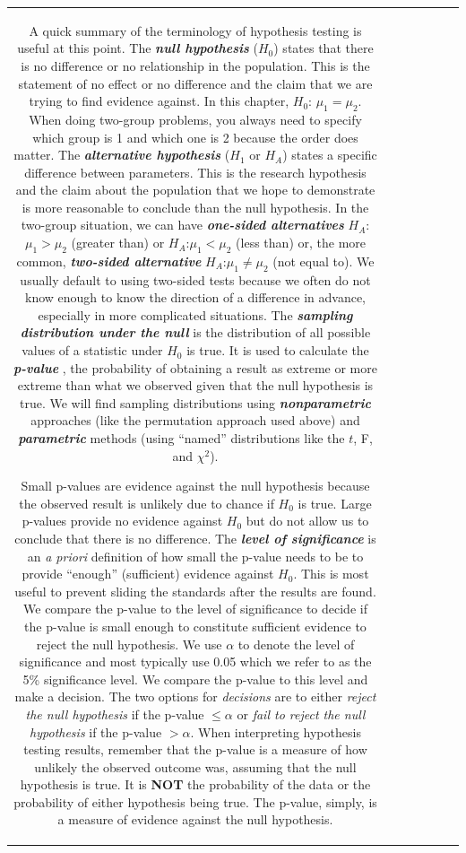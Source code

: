 \documentclass[]{book}
\theoremstyle{definition}
\theoremstyle{definition}
\theoremstyle{remark}
\begin{document}
\begin{longtable}[]{@{}ccccccc@{}}
\begin{minipage}[b]{0.10\columnwidth}
A quick summary of the terminology of hypothesis testing is useful at
this point. The \textbf{\emph{null hypothesis}} (\(H_0\)) states that
there is no difference or no relationship in the population. This is the
statement of no effect or no difference and the claim that we are trying
to find evidence against. In this chapter, \(H_0\): \(\mu_1=\mu_2\).
When doing two-group problems, you always need to specify which group is
1 and which one is 2 because the order does matter. The
\textbf{\emph{alternative hypothesis}} (\(H_1\) or \(H_A\)) states a
specific difference between parameters. This is the research hypothesis
and the claim about the population that we hope to demonstrate is more
reasonable to conclude than the null hypothesis. In the two-group
situation, we can have \textbf{\emph{one-sided alternatives}}
\(H_A\):\(\mu_1 > \mu_2\) (greater than) or \(H_A\):\(\mu_1 < \mu_2\)
(less than) or, the more common, \textbf{\emph{two-sided alternative}}
\(H_A\):\(\mu_1 \ne \mu_2\) (not equal to). We usually default to using
two-sided tests because we often do not know enough to know the
direction of a difference in advance, especially in more complicated
situations. The \textbf{\emph{sampling distribution under the null}} is
the distribution of all possible values of a statistic under \(H_0\) is
true. It is used to calculate the \textbf{\emph{p-value}} , the
probability of obtaining a result as extreme or more extreme than what
we observed given that the null hypothesis is true. We will find
sampling distributions using \textbf{\emph{nonparametric}} approaches
(like the permutation approach used above) and
\textbf{\emph{parametric}} methods (using ``named'' distributions like
the \(t\), F, and \(\chi^2\)).

Small p-values are evidence against the null hypothesis because the
observed result is unlikely due to chance if \(H_0\) is true. Large
p-values provide no evidence against \(H_0\) but do not allow us to
conclude that there is no difference. The \textbf{\emph{level of
significance}} is an \emph{a priori} definition of how small the p-value
needs to be to provide ``enough'' (sufficient) evidence against \(H_0\).
This is most useful to prevent sliding the standards after the results
are found. We compare the p-value to the level of significance to decide
if the p-value is small enough to constitute sufficient evidence to
reject the null hypothesis. We use \(\alpha\) to denote the level of
significance and most typically use 0.05 which we refer to as the 5\%
significance level. We compare the p-value to this level and make a
decision. The two options for \emph{decisions} are to either
\emph{reject the null hypothesis} if the p-value \(\le \alpha\) or
\emph{fail to reject the null hypothesis} if the p-value \(> \alpha\).
When interpreting hypothesis testing results, remember that the p-value
is a measure of how unlikely the observed outcome was, assuming that the
null hypothesis is true. It is \textbf{NOT} the probability of the data
or the probability of either hypothesis being true. The p-value, simply,
is a measure of evidence against the null hypothesis.


\end{minipage}
\end{longtable}
\end{document}
